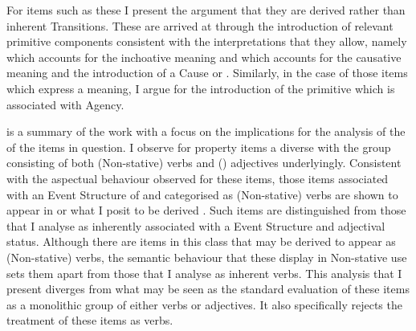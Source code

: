 For items such as these I present the argument that they are derived rather than
inherent Transitions. These are arrived at through the introduction of relevant
primitive components consistent with the interpretations that they allow, namely
\BECOME which accounts for the inchoative meaning and \CAUSE which accounts for
the causative meaning and the introduction of a Cause or . Similarly, in
the case of those  items which express a  meaning, I argue for the
introduction of the primitive \DO which is associated with Agency.

 is a summary of the work with a focus on the implications for the
analysis of the  of the items in question.  I observe for
property items a diverse  with the group consisting of both
(Non-stative) verbs and () adjectives underlyingly. Consistent with the
aspectual behaviour observed for these items, those items associated with an
Event Structure of  and categorised as (Non-stative) verbs are shown
to appear in  or what I posit to be derived . Such items
are distinguished from those that I analyse as inherently associated with a
 Event Structure and adjectival status.  Although there are items in this
class that may be derived to appear as (Non-stative) verbs, the semantic
behaviour that these display in Non-stative use sets them apart from those that
I analyse as inherent verbs. This analysis that I present diverges from what may
be seen as the standard evaluation of these items as a monolithic group of
either verbs or adjectives. It also specifically rejects the treatment of these
items as  verbs.
